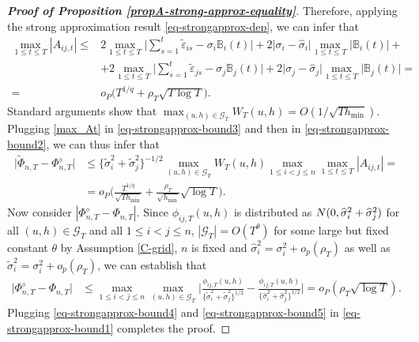 \documentclass[a4paper,12pt]{article}
\begin{document}
\begin{proof}[\textnormal{\textbf{Proof of Proposition \ref{propA-strong-approx-equality}}}]
Therefore, applying the strong approximation result \eqref{eq-strongapprox-dep}, we can infer that
\begin{align}\label{max_At}
\max_{1 \le t \le T} |A_{ij, t}|  \le & 2 \max_{1 \le t \le T} \Big| \sum\limits_{s=1}^t \widetilde{\varepsilon}_{is} - \sigma_i \mathbb{B}_{i}(t) \Big| + 2\big|\sigma_i - \widehat{\sigma}_i\big|  \max_{1 \le t \le T}\big|\mathbb{B}_{i}(t) \big| +\nonumber\\
&+ 2 \max_{1 \le t \le T} \Big| \sum\limits_{s=1}^t \widetilde{\varepsilon}_{js} - \sigma_j \mathbb{B}_{j}(t) \Big| + 2\big|\sigma_j - \widehat{\sigma}_j\big| \max_{1 \le t \le T} \big| \mathbb{B}_{j}(t) \big| = \nonumber\\
=& o_P\big(T^{1/q} + \rho_T \sqrt{T \log T}\big). 
\end{align}
Standard arguments show that $\max_{(u,h) \in \mathcal{G}_T} W_T(u,h) = O( 1/\sqrt{Th_{\min}} )$. Plugging \eqref{max_At} in \eqref{eq-strongapprox-bound3} and then in \eqref{eq-strongapprox-bound2}, we can thus infer that 
\begin{align}\label{eq-strongapprox-bound4}
\big| \widetilde{\Phi}_{n, T} - \Phi_{n, T}^{\diamond} \big| &\le \{\widetilde{\sigma}_i^2 + \widetilde{\sigma}_j^2 \}^{-1/2}  \max_{(u,h) \in \mathcal{G}_T} W_T(u, h) \max_{1\le i < j \le n}\max_{1\le t \le T} |A_{ij, t}|=\nonumber \\
&= o_P\Big( \frac{T^{1/q}}{\sqrt{Th_{\min}}} + \frac{\rho_T}{\sqrt{h_{\min}}}\sqrt{\log T} \Big).
\end{align}
Now consider $|\Phi_{n, T}^{\diamond} - \Phi_{n, T}|$. Since $\phi_{ij, T}(u,h)$ is distributed as $ N(0,\widehat{\sigma}^2_i + \widehat{\sigma}^2_j)$ for all $(u,h) \in \mathcal{G}_T$ and all $1\le i < j \le n$, $|\mathcal{G}_T| = O(T^\theta)$ for some large but fixed constant $\theta$ by Assumption \ref{C-grid}, $n$ is fixed and $\widehat{\sigma}^2_i = \sigma^2_i + o_p(\rho_T)$ as well as $\widetilde{\sigma}^2_i = \sigma^2_i + o_p(\rho_T)$, we can establish that
\begin{align}\label{eq-strongapprox-bound5}
\big| \Phi_{n, T}^{\diamond} - \Phi_{n, T} \big| &\le \max_{1\leq i< j \leq n}\max_{(u,h) \in \mathcal{G}_T} \Big|\frac{\phi_{ij, T}(u,h)}{\{\widetilde{\sigma}_i^2 + \widetilde{\sigma}_j^2 \}^{1/2}} - \frac{\phi_{ij, T}(u,h)}{\{\widehat{\sigma}_i^2 + \widehat{\sigma}_j^2 \}^{1/2}}\Big| = o_P(\rho_T \sqrt{\log T}).
\end{align}
Plugging \eqref{eq-strongapprox-bound4} and \eqref{eq-strongapprox-bound5} in \eqref{eq-strongapprox-bound1} completes the proof.
\end{proof}
\end{document}
